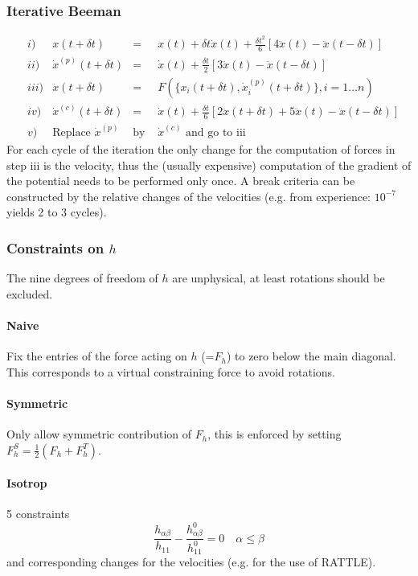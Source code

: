 \subsubsection{Iterative Beeman}
\begin{align}
&  i) &x(t+\delta t)  & = & x(t) +\delta t \dot{x}(t)+\frac{\delta t^2}{6}\left[4\ddot{x}(t)-\ddot{x}(t-\delta t)\right] \\
&  ii) &\dot{x}^{(p)}(t+\delta t) & = & \dot{x}(t) +\frac{\delta t}{2}\left[3\ddot{x}(t)-\ddot{x}(t-\delta t)\right]\\
&  iii) &\ddot{x}(t+\delta t) & = & F\left(\{x_i(t+\delta t), \dot{x}_i^{(p)}(t+ \delta t)\}, i = 1 \dots n \right)\\
&  iv) &\dot{x}^{(c)}(t+\delta t) & = & \dot{x}(t)+\frac{\delta t}{6}\left[2\ddot{x}(t+\delta t)+5\ddot{x}(t)-\ddot{x}(t- \delta t)\right]\\
&  v) & \textrm{Replace } \dot{x}^{(p)} & \textrm{by }& \dot{x}^{(c)} \textrm{ and go to iii}
\end{align}
For each cycle of the iteration the only change for the computation of forces in step iii is the velocity, thus the (usually expensive) computation of the gradient of the potential needs to be performed only once. A break criteria can be constructed by the relative changes of the velocities (e.g. from experience: \(10^{-7}\) yields 2 to 3 cycles).

\subsubsection{Constraints on $h$}
The nine degrees of freedom of \(h\) are unphysical, at least rotations should be excluded.
\paragraph{Naive}
Fix the entries of the force acting on \(h\) (=\(F_h\)) to zero below the main diagonal. This corresponds to a virtual constraining force to avoid rotations.
\paragraph{Symmetric}
Only allow symmetric contribution of \(F_h\), this is enforced by setting  \( F_h^S = \frac{1}{2}(F_h+F_h^T)\).
\paragraph{Isotrop}
5 constraints
\begin{equation}
  \frac{h_{\alpha \beta}}{h_{11}} - \frac{h_{\alpha \beta}^0}{h_{11}^0} = 0 \quad \alpha \leq \beta
\end{equation}
and corresponding changes for the velocities (e.g. for the use of RATTLE).

